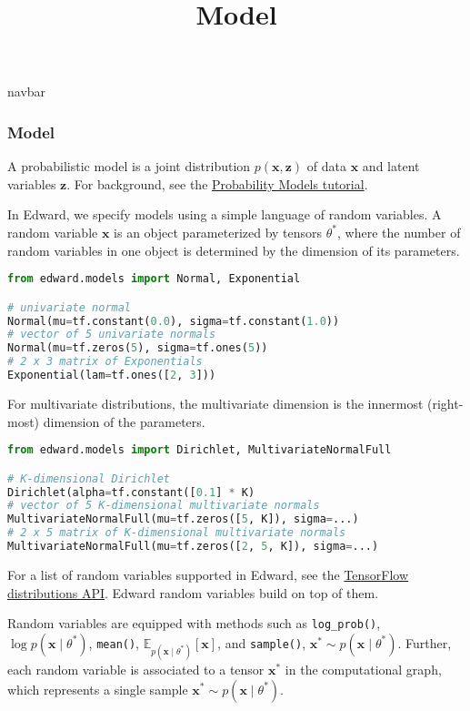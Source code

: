 \title{Model}

{{navbar}}

\subsubsection{Model}

A probabilistic model is a joint distribution $p(\mathbf{x},
\mathbf{z})$ of data $\mathbf{x}$ and latent variables $\mathbf{z}$.
For background, see the \href{/tutorials/model}{Probability Models tutorial}.

In Edward, we specify models using a simple language of random variables.
A random variable $\mathbf{x}$ is an object parameterized by
tensors $\theta^*$, where
the number of random variables in one object is determined by
the dimension of its parameters.

\begin{lstlisting}[language=Python]
from edward.models import Normal, Exponential

# univariate normal
Normal(mu=tf.constant(0.0), sigma=tf.constant(1.0))
# vector of 5 univariate normals
Normal(mu=tf.zeros(5), sigma=tf.ones(5))
# 2 x 3 matrix of Exponentials
Exponential(lam=tf.ones([2, 3]))
\end{lstlisting}

For multivariate distributions, the multivariate dimension is the
innermost (right-most) dimension of the parameters.

\begin{lstlisting}[language=Python]
from edward.models import Dirichlet, MultivariateNormalFull

# K-dimensional Dirichlet
Dirichlet(alpha=tf.constant([0.1] * K)
# vector of 5 K-dimensional multivariate normals
MultivariateNormalFull(mu=tf.zeros([5, K]), sigma=...)
# 2 x 5 matrix of K-dimensional multivariate normals
MultivariateNormalFull(mu=tf.zeros([2, 5, K]), sigma=...)
\end{lstlisting}

For a list of random variables supported in Edward, see the
\href{https://www.tensorflow.org/versions/master/api_docs/python/contrib.distributions.html}{TensorFlow distributions API}.
Edward random variables build on top of them.

Random variables are equipped with methods such as
\texttt{log_prob()}, $\log p(\mathbf{x}\mid\theta^*)$,
\texttt{mean()}, $\mathbb{E}_{p(\mathbf{x}\mid\theta^*)}[\mathbf{x}]$,
and \texttt{sample()}, $\mathbf{x}^*\sim p(\mathbf{x}\mid\theta^*)$.
Further, each random variable is associated to a tensor $\mathbf{x}^*$ in the
computational graph, which represents a single sample $\mathbf{x}^*\sim
p(\mathbf{x}\mid\theta^*)$.

